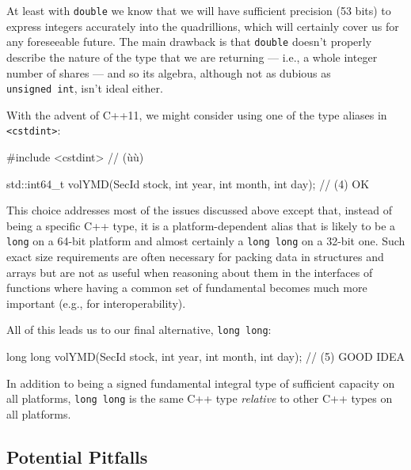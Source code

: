 \noindent At least with \lstinline!double! we know that we will have sufficient precision (53 bits) to express
integers accurately into the quadrillions, which will certainly cover us
for any foreseeable future. The main drawback is that \lstinline!double!
doesn't properly describe the nature of the type that we are returning
--- i.e., a whole integer number of shares --- and so its algebra,
although not as dubious as \lstinline!unsigned!~\lstinline!int!, isn't ideal
either.

With the advent of C++11, we might consider using one of the type aliases
in \lstinline!<cstdint>!:

\begin{emcppshiddenlisting}[emcppsbatch={e5}]
#include <cstdint>  // (ù{}ù)
\end{emcppshiddenlisting}
\begin{emcppslisting}[emcppsbatch=e5]
std::int64_t volYMD(SecId stock, int year, int month, int day);  // (4) OK
\end{emcppslisting}

\noindent This choice addresses most of the issues discussed above except that,
instead of being a specific C++ type, it is a platform-dependent alias
that is likely to be a \lstinline!long! on a 64-bit platform and almost
certainly a \lstinline!long!~\lstinline!long! on a 32-bit one. Such exact size
requirements are often necessary for packing data in structures and
arrays but are not as useful when reasoning about them in the
interfaces of functions where having a common set of fundamental
 becomes much more important (e.g., for
interoperability).

All of this leads us to our final alternative, \lstinline!long!~\lstinline!long!:

\begin{emcppslisting}[emcppsbatch=e6]
long long volYMD(SecId stock, int year, int month, int day);  // (5) GOOD IDEA
\end{emcppslisting}

\noindent In addition to being a signed fundamental integral type of sufficient
capacity on all platforms, \lstinline!long!~\lstinline!long! is the same C++
type \emph{relative} to other C++ types on all platforms.

\subsection[Potential Pitfalls]{Potential Pitfalls}\label{longlong-potential-pitfalls}

